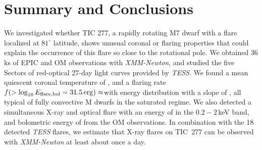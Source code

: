 \documentclass[twocolumn]{aastex631}
\begin{document}





 








\section{Summary and Conclusions}
\label{sec:summary}
We investigated whether TIC 277, a rapidly rotating M7 dwarf with a flare localized at $81^{\circ}$ latitude, shows unusual coronal or flaring properties that could explain the occurrence of this flare so close to the rotational pole. We obtained 36 ks of EPIC and OM observations with \textit{XMM-Newton}, and studied the five Sectors of red-optical 27-day light curves provided by \textit{TESS}. We found a mean quiescent coronal temperature of \Tqmean, and a flaring rate $f(> \log_{10} E_{\rm flare, bol} = 31.5\,\rm{erg})\approx$\ffdr with energy distribution with a slope of \ffdalpha, all typical of fully convective M dwarfs in the saturated regime. We also detected a simultaneous X-ray and optical flare with an energy of \eepic in the $0.2-2\,$keV band, and bolometric energy of \eom from the OM observations. In combination with the 18 detected \textit{TESS} flares, we estimate that X-ray flares on TIC~277 can be observed with \textit{XMM-Newton} at least about once a day. %
\end{document}
